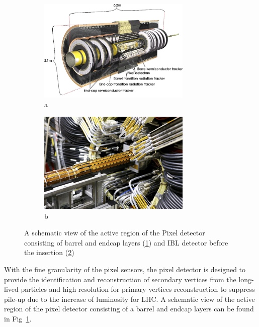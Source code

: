 \begin{figure}
\begin{subfigure}{.5\textwidth}
 \centering
  \includegraphics[width=0.8\textwidth]{chapters/c4/figures/pixel}
 \caption{a}
 \label{fig:pixel1}
\end{subfigure}%
\begin{subfigure}{.5\textwidth}
 \centering
  \includegraphics[width=0.8\textwidth]{chapters/c4/figures/IBL}
 \caption{b}
 \label{fig:pixel2}
\end{subfigure}
  \caption{A schematic view of the active region of the Pixel detector consisting of barrel and endcap layers (\ref{fig:pixel1}) and IBL detector before the insertion (\ref{fig:pixel2})}
\label{fig:pixel}
\end{figure}
\par With the fine granularity of the pixel sensors, the pixel detector is designed to provide the identification and reconstruction of secondary vertices from the long-lived particles and high resolution for primary vertices reconstruction to suppress pile-up due to the increase of luminosity for LHC. A schematic view of the active region of the pixel detector consisting of a barrel and endcap layers can be found in Fig~\ref{fig:pixel1}.

